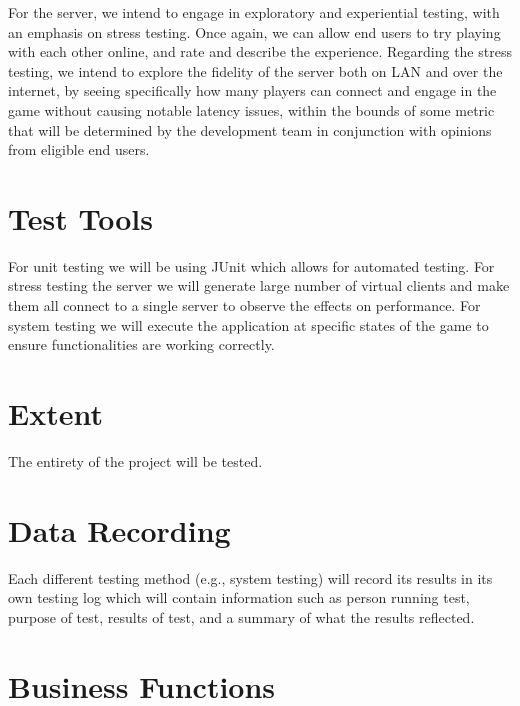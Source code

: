 \documentclass{article}
\begin{document}
For the server, we intend to engage in exploratory and experiential testing, with an emphasis on stress testing. Once again, we can allow end users to try playing with each other online, and rate and describe the experience. Regarding the stress testing, we intend to explore the fidelity of the server both on LAN and over the internet, by seeing specifically how many players can connect and engage in the game without causing notable latency issues, within the bounds of some metric that will be determined by the development team in conjunction with opinions from eligible end users.

\section{Test Tools}

For unit testing we will be using JUnit which allows for automated testing. For stress testing the server we will generate large number of virtual clients and make them all connect to a single server to observe the effects on performance. For system testing we will execute the application at specific states of the game to ensure functionalities are working correctly.

\section{Extent}

The entirety of the project will be tested.

\section{Data Recording}

Each different testing method (e.g., system testing) will record its results in its own testing log which will contain information such as person running test, purpose of test, results of test, and a summary of what the results reflected.

\section{Business Functions}
\end{document}
